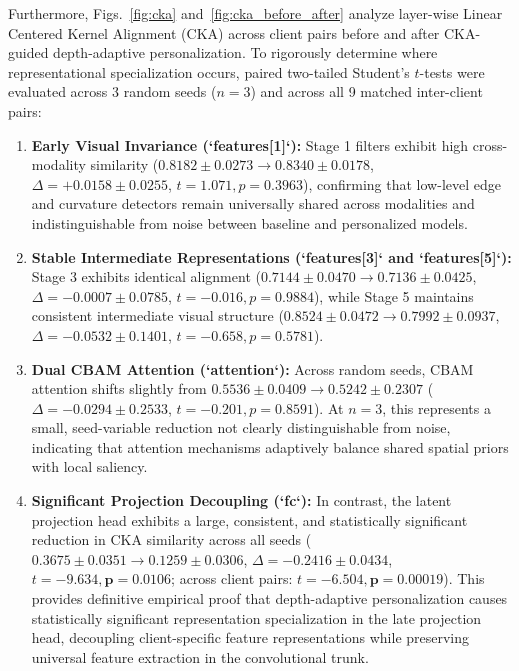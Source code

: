 \documentclass[journal]{IEEEtran}
\begin{document}
Furthermore, Figs.~\ref{fig:cka} and~\ref{fig:cka_before_after} analyze layer-wise Linear Centered Kernel Alignment (CKA) across client pairs before and after CKA-guided depth-adaptive personalization. To rigorously determine where representational specialization occurs, paired two-tailed Student's $t$-tests were evaluated across 3 random seeds ($n=3$) and across all 9 matched inter-client pairs:
\begin{enumerate}
    \item \textbf{Early Visual Invariance (`features[1]`):} Stage 1 filters exhibit high cross-modality similarity ($0.8182 \pm 0.0273 \to 0.8340 \pm 0.0178$, $\Delta = +0.0158 \pm 0.0255$, $t=1.071, p=0.3963$), confirming that low-level edge and curvature detectors remain universally shared across modalities and indistinguishable from noise between baseline and personalized models.
    \item \textbf{Stable Intermediate Representations (`features[3]` and `features[5]`):} Stage 3 exhibits identical alignment ($0.7144 \pm 0.0470 \to 0.7136 \pm 0.0425$, $\Delta = -0.0007 \pm 0.0785$, $t=-0.016, p=0.9884$), while Stage 5 maintains consistent intermediate visual structure ($0.8524 \pm 0.0472 \to 0.7992 \pm 0.0937$, $\Delta = -0.0532 \pm 0.1401$, $t=-0.658, p=0.5781$).
    \item \textbf{Dual CBAM Attention (`attention`):} Across random seeds, CBAM attention shifts slightly from $0.5536 \pm 0.0409 \to 0.5242 \pm 0.2307$ ($\Delta = -0.0294 \pm 0.2533$, $t=-0.201, p=0.8591$). At $n=3$, this represents a small, seed-variable reduction not clearly distinguishable from noise, indicating that attention mechanisms adaptively balance shared spatial priors with local saliency.
    \item \textbf{Significant Projection Decoupling (`fc`):} In contrast, the latent projection head exhibits a large, consistent, and statistically significant reduction in CKA similarity across all seeds ($0.3675 \pm 0.0351 \to 0.1259 \pm 0.0306$, $\Delta = \mathbf{-0.2416 \pm 0.0434}$, $t = -9.634, \mathbf{p = 0.0106}$; across client pairs: $t = -6.504, \mathbf{p = 0.00019}$). This provides definitive empirical proof that depth-adaptive personalization causes statistically significant representation specialization in the late projection head, decoupling client-specific feature representations while preserving universal feature extraction in the convolutional trunk.
\end{enumerate}
\end{document}
